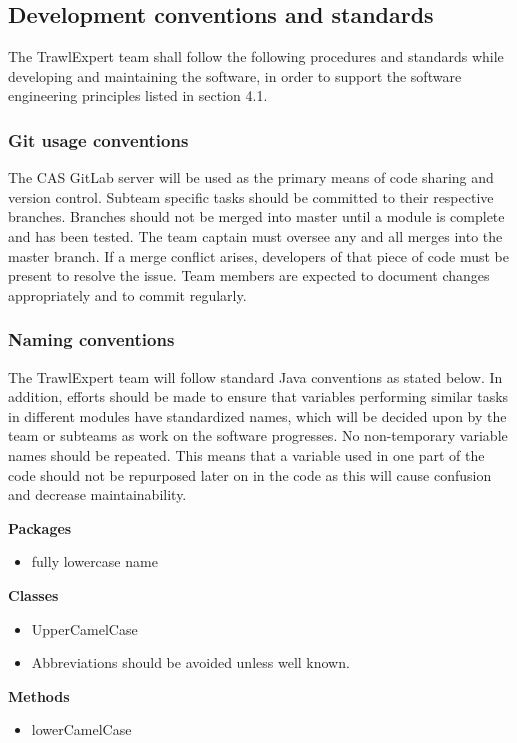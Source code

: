 \documentclass{article}
\begin{document}
\subsection{Development conventions and standards}
The TrawlExpert team shall follow the following procedures and standards while developing and maintaining the software, in order to support the software engineering principles listed in section 4.1.

\subsubsection{Git usage conventions}
The CAS GitLab server will be used as the primary means of code sharing and version control. Subteam specific tasks should be committed to their respective branches. Branches should not be merged into master until a module is complete and has been tested. The team captain must oversee any and all merges into the master branch. If a merge conflict arises, developers of that piece of code must be present to resolve the issue. Team members are expected to document changes appropriately and to commit regularly.

\subsubsection{Naming conventions}
The TrawlExpert team will follow standard Java conventions as stated below.
In addition, efforts should be made to ensure that variables performing similar tasks in different modules have standardized names, which will be decided upon by the team or subteams as work on the software progresses. No non-temporary variable names should be repeated. This means that a variable used in one part of the code should not be repurposed later on in the code as this will cause confusion and decrease maintainability.
 
\noindent\textbf{Packages}
\begin{itemize}
\item fully lowercase name
\end{itemize}
 
\noindent\textbf{Classes}
\begin{itemize}
\item UpperCamelCase
\item Abbreviations should be avoided unless well known.
\end{itemize}

\noindent\textbf{Methods}
\begin{itemize}
\item lowerCamelCase
\end{itemize}
 
\end{document}
